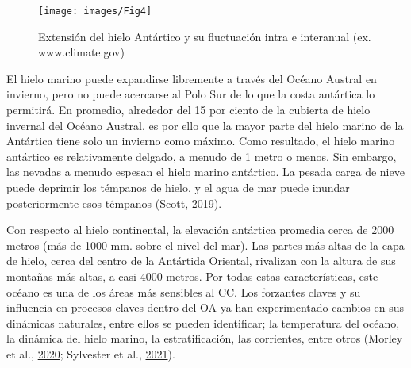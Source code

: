 \documentclass[
]{article}
\begin{document}
\begin{figure}

{\centering \texttt{[image: images/Fig4]} 

}

\caption{Extensión del hielo Antártico y su fluctuación intra e interanual (ex. www.climate.gov)}\label{fig:unnamed-chunk-1}
\end{figure}

El hielo marino puede expandirse libremente a través del Océano Austral
en invierno, pero no puede acercarse al Polo Sur de lo que la costa
antártica lo permitirá. En promedio, alrededor del 15 por ciento de la
cubierta de hielo invernal del Océano Austral, es por ello que la mayor
parte del hielo marino de la Antártica tiene solo un invierno como
máximo. Como resultado, el hielo marino antártico es relativamente
delgado, a menudo de 1 metro o menos. Sin embargo, las nevadas a menudo
espesan el hielo marino antártico. La pesada carga de nieve puede
deprimir los témpanos de hielo, y el agua de mar puede inundar
posteriormente esos témpanos (Scott,
\protect\hyperlink{ref-Scott2019}{2019}).

Con respecto al hielo continental, la elevación antártica promedia cerca
de 2000 metros (más de 1000 mm. sobre el nivel del mar). Las partes más
altas de la capa de hielo, cerca del centro de la Antártida Oriental,
rivalizan con la altura de sus montañas más altas, a casi 4000 metros.
Por todas estas características, este océano es una de los áreas más
sensibles al CC. Los forzantes claves y su influencia en procesos claves
dentro del OA ya han experimentado cambios en sus dinámicas naturales,
entre ellos se pueden identificar; la temperatura del océano, la
dinámica del hielo marino, la estratificación, las corrientes, entre
otros (Morley et al., \protect\hyperlink{ref-Morley2020}{2020};
Sylvester et al., \protect\hyperlink{ref-Sylvester2021}{2021}).
\end{document}
